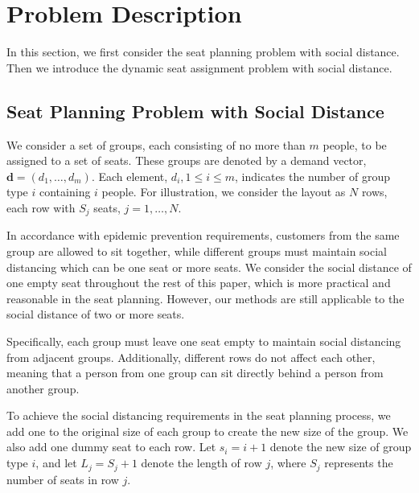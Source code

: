 \section{Problem Description}
In this section, we first consider the seat planning problem with social distance. Then we introduce the dynamic seat assignment problem with social distance.





\subsection{Seat Planning Problem with Social Distance}\label{dynamic_demand}
We consider a set of groups, each consisting of no more than $m$ people, to be assigned to a set of seats. These groups are denoted by a demand vector, $\mathbf{d} = (d_1, \ldots, d_m)$. Each element, $d_i, 1 \leq i \leq m$, indicates the number of group type $i$ containing $i$ people. For illustration, we consider the layout as $N$ rows, each row with $S_{j}$ seats, $j = 1, \ldots, N$. 

In accordance with epidemic prevention requirements, customers from the same group are allowed to sit together, while different groups must maintain social distancing which can be one seat or more seats. We consider the social distance of one empty seat throughout the rest of this paper, which is more practical and reasonable in the seat planning. However, our methods are still applicable to the social distance of two or more seats.

Specifically, each group must leave one seat empty to maintain social distancing from adjacent groups. Additionally, different rows do not affect each other, meaning that a person from one group can sit directly behind a person from another group.

To achieve the social distancing requirements in the seat planning process, we add one to the original size of each group to create the new size of the group. We also add one dummy seat to each row. Let $s_i = i + 1$ denote the new size of group type $i$, and let $L_j = S_j + 1$ denote the length of row $j$, where $S_j$ represents the number of seats in row $j$.

